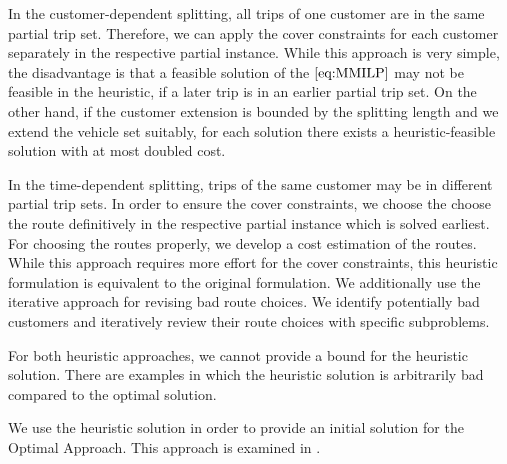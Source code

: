 In the customer-dependent splitting, all trips of one customer are in the same partial trip set. Therefore, we can apply the cover constraints for each customer separately in the respective partial instance. While this approach is very simple, the disadvantage is that a feasible solution of the $\eqref{eq:MMILP}$ may not be feasible in the heuristic, if a later trip is in an earlier partial trip set. On the other hand, if the customer extension is bounded by the splitting length and we extend the vehicle set suitably, for each solution there exists a heuristic-feasible solution with at most doubled cost.

In the time-dependent splitting, trips of the same customer may be in different partial trip sets. In order to ensure the cover constraints, we choose the choose the route definitively in the respective partial instance which is solved earliest. For choosing the routes properly, we develop a cost estimation of the routes. While this approach requires more effort for the cover constraints, this heuristic formulation is equivalent to the original formulation. We additionally use the iterative approach for revising bad route choices. We identify potentially bad customers and iteratively review their route choices with specific subproblems.

For both heuristic approaches, we cannot provide a bound for the heuristic solution. There are examples in which the heuristic solution is arbitrarily bad compared to the optimal solution.

We use the heuristic solution in order to provide an initial solution for the Optimal Approach. This approach is examined in .